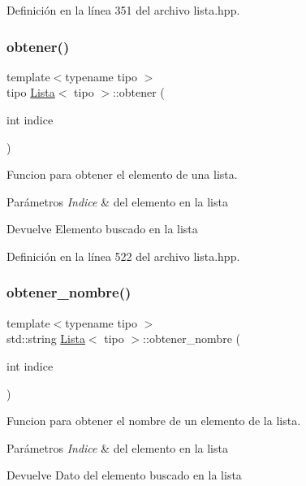 Definición en la línea 351 del archivo lista.\+hpp.

\mbox{\label{classLista_a8ae71c3b813589c892ab1f4ff8edd753}} 
\subsubsection{\texorpdfstring{obtener()}{obtener()}}
{\footnotesize\ttfamily template$<$typename tipo $>$ \\
tipo \hyperlink{classLista}{Lista}$<$ tipo $>$\+::obtener (\begin{DoxyParamCaption}\item[{int}]{indice }\end{DoxyParamCaption})}



Funcion para obtener el elemento de una lista. 


\begin{DoxyParams}{Parámetros}
{\em Indice} & del elemento en la lista \\
\hline
\end{DoxyParams}
\begin{DoxyReturn}{Devuelve}
Elemento buscado en la lista 
\end{DoxyReturn}


Definición en la línea 522 del archivo lista.\+hpp.

\mbox{\label{classLista_ac1b4a38c8aee5835dcbb3185972c1b11}} 
\subsubsection{\texorpdfstring{obtener\+\_\+nombre()}{obtener\_nombre()}}
{\footnotesize\ttfamily template$<$typename tipo $>$ \\
std\+::string \hyperlink{classLista}{Lista}$<$ tipo $>$\+::obtener\+\_\+nombre (\begin{DoxyParamCaption}\item[{int}]{indice }\end{DoxyParamCaption})}



Funcion para obtener el nombre de un elemento de la lista. 


\begin{DoxyParams}{Parámetros}
{\em Indice} & del elemento en la lista \\
\hline
\end{DoxyParams}
\begin{DoxyReturn}{Devuelve}
Dato del elemento buscado en la lista 
\end{DoxyReturn}


